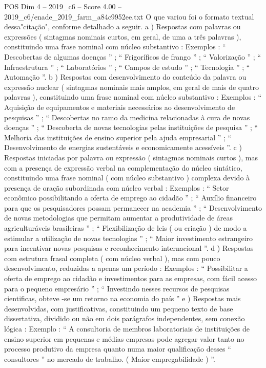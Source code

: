 \begin{textsample}{POS Dim 4 – 2019\_c6 – Score 4.00 – 2019\_c6/enade\_2019\_farm\_a84c9952ee.txt}
O que variou foi o formato textual dessa"citação", conforme detalhado a seguir. a ) Respostas com palavras ou expressões ( sintagmas nominais curtos, em geral, de uma a três palavras ), constituindo uma frase nominal com núcleo substantivo : Exemplos : “ Descobertas de algumas doenças ” ; “ Frigoríficos de frango ” ; “ Valorização ” ; “ Infraestrutura ” ; “ Laboratórios ” ; “ Campos de estudo ” ; “ Tecnologia ” ; “ Automação ”. b ) Respostas com desenvolvimento do conteúdo da palavra ou expressão nuclear ( sintagmas nominais mais amplos, em geral de mais de quatro palavras ), constituindo uma frase nominal com núcleo substantivo : Exemplos : “ Aquisição de equipamentos e materiais necessários ao desenvolvimento de pesquisas ” ; “ Descobertas no ramo da medicina relacionadas à cura de novas doenças ” ; “ Descoberta de novas tecnologias pelas instituições de pesquisa ” ; “ Melhoria das instituições de ensino superior pela ajuda empresarial ” ; “ Desenvolvimento de energias sustentáveis e economicamente acessíveis ”. c ) Respostas iniciadas por palavra ou expressão ( sintagmas nominais curtos ), mas com a presença de expressão verbal na complementação do núcleo sintático, constituindo uma frase nominal ( com núcleo substantivo ) complexa devido à presença de oração subordinada com núcleo verbal : Exemplos : “ Setor econômico possibilitando a oferta de emprego ao cidadão ” ; “ Auxílio financeiro para que os pesquisadores possam permanecer na academia ” ; “ Desenvolvimento de novas metodologias que permitam aumentar a produtividade de áreas agriculturáveis brasileiras ” ; “ Flexibilização de leis ( ou criação ) de modo a estimular a utilização de novas tecnologias ” ; “ Maior investimento estrangeiro para incentivar novas pesquisas e reconhecimento internacional ”. d ) Respostas com estrutura frasal completa ( com núcleo verbal ), mas com pouco desenvolvimento, reduzidas a apenas um período : Exemplos : “ Possibilitar a oferta de emprego ao cidadão e investimentos para as empresas, com fácil acesso para o pequeno empresário ” ; “ Investindo nesses recursos de pesquisas cientificas, obteve -se um retorno na economia do país ” e ) Respostas mais desenvolvidas, com justificativas, constituindo um pequeno texto de base dissertativa, dividido ou não em dois parágrafos independentes, sem conexão lógica : Exemplo : “ A consultoria de membros laboratoriais de instituições de ensino superior em pequenas e médias empresas pode agregar valor tanto no processo produtivo da empresa quanto numa maior qualificação desses “ consultores ” no mercado de trabalho. ( Maior empregabilidade ) ”.

\end{textsample}
